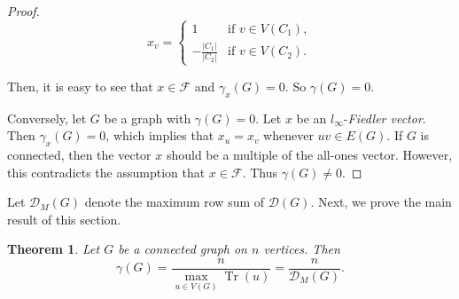 \documentclass[12pt]{article}
\newtheorem{theorem}{Theorem}[section]
\DeclareMathOperator{\tr}{Tr}
\begin{document}
{{\begin{proof}
				$$   x_v =
				\left\{
				\begin{array}{ll}
					1  & \mbox{if } v \in V(C_1), \\
					-\frac{|C_1|}{|C_2|} & \mbox{if } v \in V(C_2).
				\end{array}
				\right.
				$$
				
				Then, it is easy to see that  $x \in \mathcal{F}$ and $\gamma_x(G) =0$. So $\gamma(G)=0$.
				
				Conversely, let $G$ be a graph with $\gamma(G)=0$. Let $x$ be an $l_{\infty}$-\textit{Fiedler vector}. Then $\gamma_x(G) =0$, which implies that $x_u=x_v$ whenever $uv \in E(G)$. 
				If $G$ is connected, then the vector $x$ should be a multiple of the all-ones vector.  However, this contradicts the assumption that $x\in \mathcal{F} $. Thus $\gamma (G) \neq 0.$
			\end{proof}
			Let $\mathcal{D}_M(G)$ denote the maximum row sum of $\mathcal{D}(G)$. Next, we prove the main result of this section.
			\begin{theorem}\label{main theorem}
				Let $G$ be a connected graph on $n$ vertices. Then
				$$
				\gamma(G)=\frac{n}{\max\limits_{u \in V(G)}  \tr(u)}=\frac{n}{\mathcal{D}_M(G)}.
				$$
				

\end{theorem}}}
\end{document}
